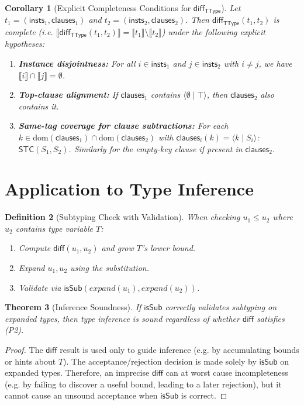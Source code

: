 \documentclass[11pt]{article}
\newtheorem{theorem}{Theorem}
\newtheorem{definition}[theorem]{Definition}
\newtheorem{corollary}[theorem]{Corollary}
\newcommand{\sem}[1]{\llbracket #1 \rrbracket}
\newcommand{\diff}{\mathsf{diff}}
\newcommand{\TType}{\mathsf{TType}}
\newcommand{\insts}{\mathsf{insts}}
\newcommand{\clauses}{\mathsf{clauses}}
\newcommand{\clause}[2]{\langle #1 \mid #2 \rangle}
\begin{document}
\begin{corollary}[Explicit Completeness Conditions for $\diff_{\TType}$]
Let $t_1=(\insts_1,\clauses_1)$ and $t_2=(\insts_2,\clauses_2)$.
Then $\diff_{\TType}(t_1,t_2)$ is complete (i.e. $\sem{\diff_{\TType}(t_1,t_2)}=\sem{t_1}\setminus\sem{t_2}$) under the following explicit hypotheses:
\begin{enumerate}
\item \textbf{Instance disjointness:}
  For all $i\in\insts_1$ and $j\in\insts_2$ with $i\neq j$, we have $\sem{i}\cap\sem{j}=\emptyset$.

\item \textbf{Top-clause alignment:}
  If $\clauses_1$ contains $\clause{\emptyset}{\top}$, then $\clauses_2$ also contains it.

\item \textbf{Same-tag coverage for clause subtractions:}
  For each $k \in \mathrm{dom}(\clauses_1)\cap \mathrm{dom}(\clauses_2)$ with $\clauses_i(k)=\clause{k}{S_i}$: $\mathsf{STC}(S_1,S_2)$.
  Similarly for the empty-key clause if present in $\clauses_2$.
\end{enumerate}
\end{corollary}

\section{Application to Type Inference}

\begin{definition}[Subtyping Check with Validation]
When checking $u_1 \leq u_2$ where $u_2$ contains type variable $T$:
\begin{enumerate}
\item Compute $\diff(u_1, u_2)$ and grow $T$'s lower bound.
\item Expand $u_1, u_2$ using the substitution.
\item Validate via $\mathsf{isSub}(\mathit{expand}(u_1), \mathit{expand}(u_2))$.
\end{enumerate}
\end{definition}

\begin{theorem}[Inference Soundness]
If $\mathsf{isSub}$ correctly validates subtyping on expanded types, then 
type inference is sound regardless of whether $\diff$ satisfies (P2).
\end{theorem}

\begin{proof}
The $\diff$ result is used only to guide inference (e.g. by accumulating bounds or hints about $T$).
The acceptance/rejection decision is made solely by $\mathsf{isSub}$ on expanded types.
Therefore, an imprecise $\diff$ can at worst cause incompleteness (e.g. by failing to discover a useful bound, leading to a later rejection), but it cannot cause an unsound acceptance when $\mathsf{isSub}$ is correct.
\end{proof}
\end{document}
